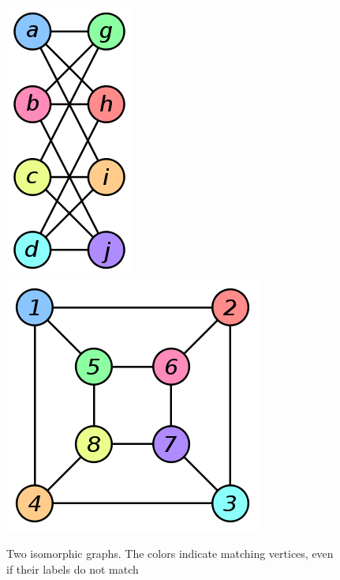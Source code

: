 \documentclass[letterpaper, 11pt]{article}
\begin{document}
    \begin{figure}[h]
        \label{graph-iso-image-figure}
        \caption{Two isomorphic graphs. The colors indicate matching vertices, even
        if their labels do not match~\cite{wikimedia-images}}
        \centering
        \includegraphics[scale=0.4]{graph-iso-a}
        \includegraphics[scale=0.4]{graph-iso-b}
    \end{figure}
\end{document}
